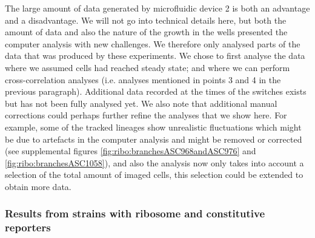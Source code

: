 The large amount of data generated by microfluidic device 2 is both an advantage and a disadvantage.
%
We will not go into technical details here, but both the amount of data and also the nature of the growth in the wells presented the computer analysis with new challenges.
%
We therefore only analysed parts of the data that was produced by these experiments.%
%
We chose to first analyse the data where we assumed cells had reached steady state; and where we can perform cross-correlation analyses (i.e. analyses mentioned in points 3 and 4 in the previous paragraph).
Additional data recorded at the times of the switches exists but has not been fully analysed yet.
%
We also note that 
additional manual corrections 
could perhaps further refine the analyses that we show here. 
%
For example, some of the tracked lineages show unrealistic fluctuations which might be due to artefacts in the computer analysis and might be removed or corrected (see supplemental figures \ref{fig:ribo:branchesASC968andASC976} and \ref{fig:ribo:branchesASC1058}), %
and also the analysis now only takes into account a selection of the total amount of imaged cells, this selection could be extended to obtain more data.

\subsubsection{Results from strains with ribosome and constitutive reporters}

